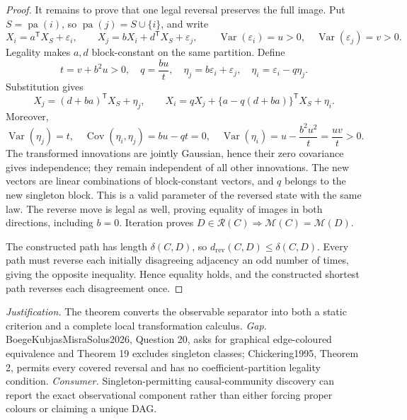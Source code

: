 \documentclass{article}
\begin{document}
\begin{proof}
It remains to prove that one legal reversal preserves the full image.  Put \(S=\operatorname{pa}(i)\), so \(\operatorname{pa}(j)=S\cup\{i\}\), and write
\[
 X_i=a^{\mathsf T}X_S+\varepsilon_i,\qquad
 X_j=bX_i+d^{\mathsf T}X_S+\varepsilon_j,\qquad
 \operatorname{Var}(\varepsilon_i)=u>0,\quad
 \operatorname{Var}(\varepsilon_j)=v>0.
\]
Legality makes \(a,d\) block-constant on the same partition.  Define
\[
 t=v+b^2u>0,\quad q=\frac{bu}{t},\quad
 \eta_j=b\varepsilon_i+\varepsilon_j,\quad
 \eta_i=\varepsilon_i-q\eta_j.
\]
Substitution gives
\[
 X_j=(d+ba)^{\mathsf T}X_S+\eta_j,\qquad
 X_i=qX_j+\{a-q(d+ba)\}^{\mathsf T}X_S+\eta_i.
\]
Moreover,
\[
 \operatorname{Var}(\eta_j)=t,\quad
 \operatorname{Cov}(\eta_i,\eta_j)=bu-qt=0,\quad
 \operatorname{Var}(\eta_i)=u-\frac{b^2u^2}{t}=\frac{uv}{t}>0.
\]
The transformed innovations are jointly Gaussian, hence their zero covariance gives independence; they remain independent of all other innovations.  The new vectors are linear combinations of block-constant vectors, and \(q\) belongs to the new singleton block.  This is a valid parameter of the reversed state with the same law.  The reverse move is legal as well, proving equality of images in both directions, including \(b=0\).  Iteration proves \(D\in\mathcal R(C)\Rightarrow\mathcal M(C)=\mathcal M(D)\).

The constructed path has length \(\delta(C,D)\), so \(d_{\mathrm{rev}}(C,D)\le\delta(C,D)\).  Every path must reverse each initially disagreeing adjacency an odd number of times, giving the opposite inequality.  Hence equality holds, and the constructed shortest path reverses each disagreement once.
\end{proof}
\par\smallskip\noindent \textit{Justification.} The theorem converts the observable separator into both a static criterion and a complete local transformation calculus. \textit{Gap.} BoegeKubjasMisraSolus2026, Question 20, asks for graphical edge-coloured equivalence and Theorem 19 excludes singleton classes; Chickering1995, Theorem 2, permits every covered reversal and has no coefficient-partition legality condition. \textit{Consumer.} Singleton-permitting causal-community discovery can report the exact observational component rather than either forcing proper colours or claiming a unique DAG.
\end{document}
